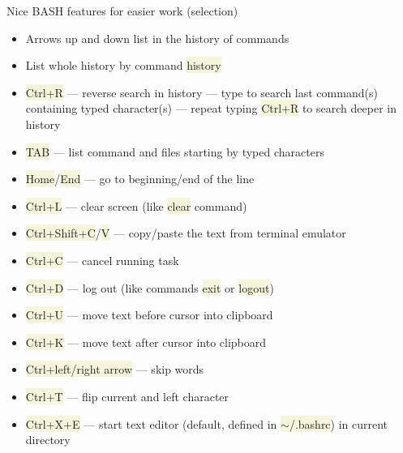 \documentclass[compress, ucs, xelatex, 11pt, xcolor=svgnames, aspectratio=169,
	hyperref={
		bookmarks=true,
		unicode=true,
		colorlinks=true,
		pdftitle={Linux, command line and MetaCentrum},
		plainpages=false,
		pdfauthor={Vojtech Zeisek},
		pdfsubject={Course about use of Linux command line, writing shell scripts and using MetaCentrum of CESNET},
		pdfcreator={XeLaTeX},
		pdfkeywords={Linux, GNU, BASH, shell, command line, MetaCentrum},
		linkcolor=DarkRed, %
		anchorcolor=DarkBlue, %
		citecolor=Indigo, %
		filecolor=NavyBlue, %
		menucolor=DarkMagenta, %
		urlcolor=DarkBlue, %
		pdftex},
	url={hyphens, lowtilde} %
	]{beamer}
\renewcommand{\texttt}[1]{\colorbox{Beige}{{\ttfamily #1}}}
\begin{document}
\begin{frame}[allowframebreaks]{Nice BASH features for easier work (selection)} %
	\begin{itemize}
		\item Arrows up and down list in the history of commands
		\item List whole history by command \texttt{history}
		\item \texttt{Ctrl+R} --- reverse search in history --- type to search last command(s) containing typed character(s) --- repeat typing \texttt{Ctrl+R} to search deeper in history
		\item \texttt{TAB} --- list command and files starting by typed characters
		\item \texttt{Home}/\texttt{End} --- go to beginning/end of the line
		\item \texttt{Ctrl+L} --- clear screen (like \texttt{clear} command)
		\item \texttt{Ctrl+Shift+C}/\texttt{V} --- copy/paste the text from terminal emulator
		\item \texttt{Ctrl+C} --- cancel running task
		\item \texttt{Ctrl+D} --- log out (like commands \texttt{exit} or \texttt{logout})
		\item \texttt{Ctrl+U} --- move text before cursor into clipboard
		\item \texttt{Ctrl+K} --- move text after cursor into clipboard
		\item \texttt{Ctrl+left/right arrow} --- skip words
		\item \texttt{Ctrl+T} --- flip current and left character
		\item \texttt{Ctrl+X+E} --- start text editor (default, defined in \texttt{$\sim$/.bashrc}) in current directory
	\end{itemize}
\end{frame}
\end{document}
